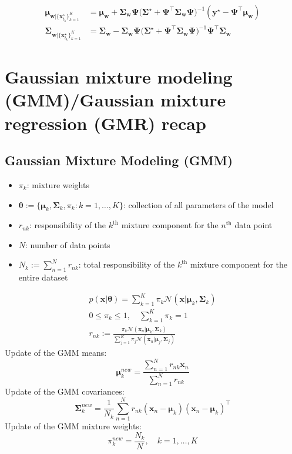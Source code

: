 \documentclass{article}
\begin{document}
\begin{align}
\bm{\mu}_{\bm{w}|\{\bm{x}_{t_k}^\star\}_{k=1}^K} &= \bm{\mu_w} + \bm{\Sigma_w}\bm{\Psi} \Big(\bm{\Sigma}^\star + \bm{\Psi}^\top \bm{\Sigma_w}\bm{\Psi} \Big)^{-1} (\bm{y}^\star - \bm{\Psi}^\top \bm{\mu_w})\\
\bm{\Sigma}_{\bm{w}|\{\bm{x}_{t_k}^\star\}_{k=1}^K} &= \bm{\Sigma_w} - \bm{\Sigma_w}\bm{\Psi} \Big(\bm{\Sigma}^\star + \bm{\Psi}^\top \bm{\Sigma_w}\bm{\Psi} \Big)^{-1} \bm{\Psi}^\top \bm{\Sigma_w}
\end{align}


\section{Gaussian mixture modeling (GMM)/Gaussian mixture regression (GMR) recap}
\subsection{Gaussian Mixture Modeling (GMM)}
\begin{itemize}
  \item $\pi_{k}$: mixture weights
  \item $\bm{\theta} := \{\bm{\mu}_{k}, \bm{\Sigma}_{k}, \pi_{k}: k=1, \dots, K\}$: collection of all parameters of the model
  \item $r_{nk}$: responsibility of the $k^{\text{th}}$ mixture component for the $n^{\text{th}}$ data point
  \item $N$: number of data points
  \item $N_{k} := \sum^{N}_{n=1} r_{nk}$: total responsibility of the $k^{\text{th}}$ mixture component for the entire dataset
\end{itemize}
\begin{gather}
  p(\bm{x}|\bm{\theta}) = \sum^{K}_{k=1} \pi_{k}  \mathcal{N}(\bm{x}|\bm{\mu}_{k}, \bm{\Sigma}_{k})\\
  0 \leq \pi_{k} \leq 1, \quad \sum^{K}_{k=1} \pi_{k} = 1\\
  r_{nk} := \frac{\pi_{k}  \mathcal{N}(\bm{x}_{n}|\bm{\mu}_{k}, \bm{\Sigma}_{k})}{\sum^{K}_{j=1} \pi_{j}  \mathcal{N}(\bm{x}_{n}|\bm{\mu}_{j}, \bm{\Sigma}_{j})}
\end{gather}
Update of the GMM means:
\begin{equation}
  \bm{\mu}_{k}^{new} = \frac{\sum_{n=1}^{N}r_{nk}\bm{x}_{n}}{\sum_{n=1}^{N}r_{nk}}
\end{equation}
Update of the GMM covariances:
\begin{equation}
  \bm{\Sigma}_{k}^{new} = \frac{1}{N_{k}} \sum^{N}_{n=1} r_{nk} (\bm{x}_{n} - \bm{\mu}_{k})(\bm{x}_{n} - \bm{\mu}_{k})^{\top}
\end{equation}
Update of the GMM mixture weights:
\begin{equation}
  \pi_{k}^{new} = \frac{N_{k}}{N}, \quad k=1, \dots, K
\end{equation}
\end{document}
